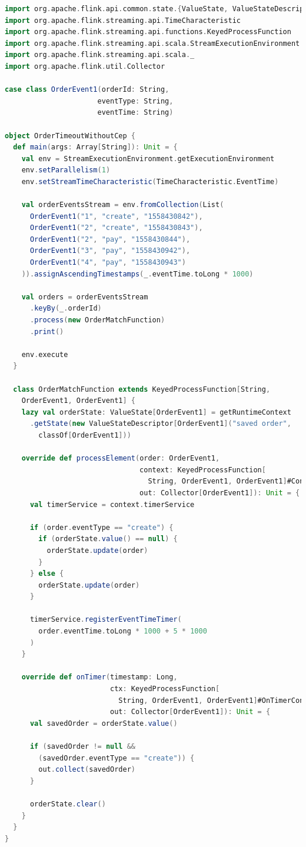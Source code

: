 \documentclass[oneside]{ctexbook}
\begin{document}
\begin{lstlisting}[language=scala, caption=OrderTimeoutWithoutCep.scala]
import org.apache.flink.api.common.state.{ValueState, ValueStateDescriptor}
import org.apache.flink.streaming.api.TimeCharacteristic
import org.apache.flink.streaming.api.functions.KeyedProcessFunction
import org.apache.flink.streaming.api.scala.StreamExecutionEnvironment
import org.apache.flink.streaming.api.scala._
import org.apache.flink.util.Collector

case class OrderEvent1(orderId: String,
                      eventType: String,
                      eventTime: String)

object OrderTimeoutWithoutCep {
  def main(args: Array[String]): Unit = {
    val env = StreamExecutionEnvironment.getExecutionEnvironment
    env.setParallelism(1)
    env.setStreamTimeCharacteristic(TimeCharacteristic.EventTime)

    val orderEventsStream = env.fromCollection(List(
      OrderEvent1("1", "create", "1558430842"),
      OrderEvent1("2", "create", "1558430843"),
      OrderEvent1("2", "pay", "1558430844"),
      OrderEvent1("3", "pay", "1558430942"),
      OrderEvent1("4", "pay", "1558430943")
    )).assignAscendingTimestamps(_.eventTime.toLong * 1000)

    val orders = orderEventsStream
      .keyBy(_.orderId)
      .process(new OrderMatchFunction)
      .print()

    env.execute
  }

  class OrderMatchFunction extends KeyedProcessFunction[String,
    OrderEvent1, OrderEvent1] {
    lazy val orderState: ValueState[OrderEvent1] = getRuntimeContext
      .getState(new ValueStateDescriptor[OrderEvent1]("saved order",
        classOf[OrderEvent1]))

    override def processElement(order: OrderEvent1,
                                context: KeyedProcessFunction[
                                  String, OrderEvent1, OrderEvent1]#Context,
                                out: Collector[OrderEvent1]): Unit = {
      val timerService = context.timerService

      if (order.eventType == "create") {
        if (orderState.value() == null) {
          orderState.update(order)
        }
      } else {
        orderState.update(order)
      }

      timerService.registerEventTimeTimer(
        order.eventTime.toLong * 1000 + 5 * 1000
      )
    }

    override def onTimer(timestamp: Long,
                         ctx: KeyedProcessFunction[
                           String, OrderEvent1, OrderEvent1]#OnTimerContext,
                         out: Collector[OrderEvent1]): Unit = {
      val savedOrder = orderState.value()

      if (savedOrder != null &&
        (savedOrder.eventType == "create")) {
        out.collect(savedOrder)
      }

      orderState.clear()
    }
  }
}
\end{lstlisting}
\end{document}
